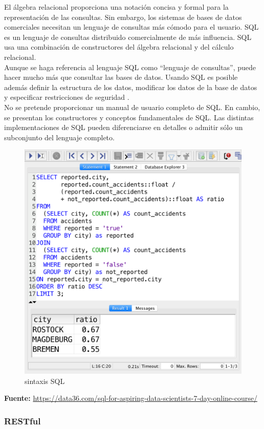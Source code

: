 		{El álgebra relacional proporciona una notación concisa y formal para la representación de las consultas. Sin embargo, los sistemas de bases de datos comerciales necesitan un lenguaje de consultas más cómodo para el usuario. SQL es un lenguaje de consultas distribuido comercialmente de más influencia. SQL usa una combinación de constructores del álgebra relacional y del cálculo relacional.\\
			
		Aunque se haga referencia al lenguaje SQL como “lenguaje de consultas”, puede hacer mucho más que consultar las bases de datos. Usando SQL es posible además definir la estructura de los datos, modificar los datos de la base de datos y especificar restricciones de seguridad \cite{dataBase}.\\
	
		No se pretende proporcionar un manual de usuario completo de SQL. En cambio, se presentan los constructores y conceptos fundamentales de SQL. Las distintas implementaciones de SQL pueden diferenciarse en detalles o admitir sólo un subconjunto del lenguaje completo.
	
		\begin{figure}[H]
			\centering
			\includegraphics[width=0.6\linewidth]{description/framework/sql.png}
			\caption{sintaxis SQL}
		\end{figure}
		\begin{center}
			\textbf{Fuente:} \url{https://data36.com/sql-for-aspiring-data-scientists-7-day-online-course/}
		\end{center}
		}
	
	
		\subsubsection{RESTful}
		
